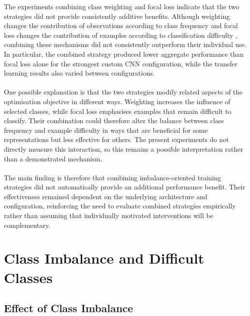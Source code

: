 \documentclass[12pt, a4paper]{report}
\let\oldsection\section
\renewcommand{\section}{%
    \Needspace{6\baselineskip}%
    \oldsection
}
\let\oldsubsection\subsection
\renewcommand{\subsection}{%
    \Needspace{6\baselineskip}%
    \oldsubsection
}
\begin{document}
				The experiments combining class weighting and focal loss indicate that the two strategies did not provide consistently additive benefits. Although weighting changes the contribution of observations according to class frequency and focal loss changes the contribution of examples according to classification difficulty \cite{Johnson2019ClassImbalance, lin2017focal}, combining these mechanisms did not consistently outperform their individual use. In particular, the combined strategy produced lower aggregate performance than focal loss alone for the strongest custom CNN configuration, while the transfer learning results also varied between configurations.\\\\
				One possible explanation is that the two strategies modify related aspects of the optimisation objective in different ways. Weighting increases the influence of selected classes, while focal loss emphasises examples that remain difficult to classify. Their combination could therefore alter the balance between class frequency and example difficulty in ways that are beneficial for some representations but less effective for others. The present experiments do not directly measure this interaction, so this remains a possible interpretation rather than a demonstrated mechanism.\\\\
				The main finding is therefore that combining imbalance-oriented training strategies did not automatically provide an additional performance benefit. Their effectiveness remained dependent on the underlying architecture and configuration, reinforcing the need to evaluate combined strategies empirically rather than assuming that individually motivated interventions will be complementary.
				
		\section{Class Imbalance and Difficult Classes}
			
			\subsection{Effect of Class Imbalance}
				
\end{document}
